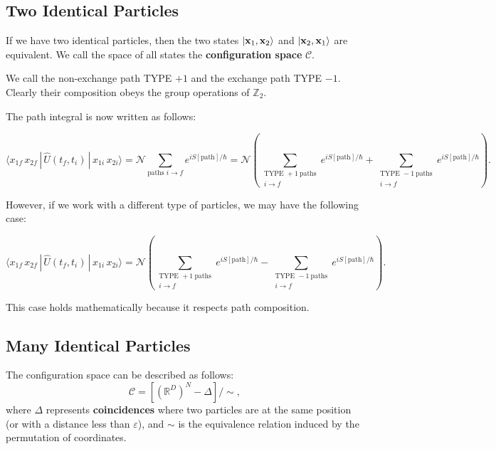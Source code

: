 \subsection{Two Identical Particles}


If we have two identical particles, then the two states $| \vb x_1, \vb x_2 \rangle$  and $| \vb x_2, \vb x_1 \rangle$ are equivalent. We call the space of all states the \textbf{configuration space} $\mathcal{C}$. 



We call the non-exchange path TYPE $+1$ and the exchange path TYPE $-1$. Clearly their composition obeys the group operations of $\mathbb{Z}_2$. 


The path integral is now written as follows:

\begin{equation*}
\label{eq:3.4}
\langle x_{1f}\,x_{2f}\,|\,\hat U(t_f,t_i)\,|\,x_{1i}\,x_{2i}\rangle
= \mathcal{N}\sum_{\text{paths } i\to f} e^{i S[\text{path}]/\hbar}
= \mathcal{N}\!\left(
\sum_{\substack{\text{TYPE }+1\ \text{paths}\\ i\to f}} e^{i S[\text{path}]/\hbar}
+ \sum_{\substack{\text{TYPE }-1\ \text{paths}\\ i\to f}} e^{i S[\text{path}]/\hbar}
\right).
\end{equation*}



However, if we work with a different type of particles, we may have the following case:

\begin{equation*}
\label{eq:3.5}
\langle x_{1f}\,x_{2f}\,|\,\hat U(t_f,t_i)\,|\,x_{1i}\,x_{2i}\rangle
= \mathcal{N}\!\left(
\sum_{\substack{\text{TYPE }+1\ \text{paths}\\ i\to f}} e^{i S[\text{path}]/\hbar}
- \sum_{\substack{\text{TYPE }-1\ \text{paths}\\ i\to f}} e^{i S[\text{path}]/\hbar}
\right).
\end{equation*}

This case holds mathematically because it respects path composition. 


\subsection{Many Identical Particles}

The configuration space can be described as follows:
$$
\mathcal{C} = [(\mathbb{R}^D)^N - \Delta] / \sim 
,$$
where $\Delta$ represents \textbf{coincidences} where two particles are at the same position (or with a distance less than $\varepsilon$), and $\sim $ is the equivalence relation induced by the permutation of coordinates.

